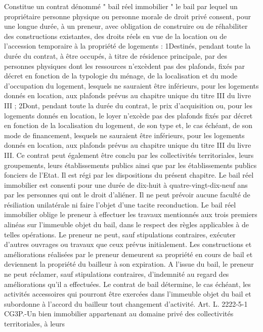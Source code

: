 \documentclass[11pt,a4paper]{report}
\begin{document}
Constitue un contrat dénommé " bail réel immobilier " le bail par lequel un propriétaire personne physique ou
personne morale de droit privé consent, pour une longue durée, à un preneur, avec obligation de construire ou
de réhabiliter des constructions existantes, des droits réels en vue de la location ou de l'accession temporaire à
la propriété de logements :
1\degre  Destinés, pendant toute la durée du contrat, à être occupés, à titre de résidence principale, par des personnes
physiques dont les ressources n'excèdent pas des plafonds, fixés par décret en fonction de la typologie du
ménage, de la localisation et du mode d'occupation du logement, lesquels ne sauraient être inférieurs, pour les
logements donnés en location, aux plafonds prévus au chapitre unique du titre III du livre III ;
2\degre  Dont, pendant toute la durée du contrat, le prix d'acquisition ou, pour les logements donnés en location, le
loyer n'excède pas des plafonds fixés par décret en fonction de la localisation du logement, de son type et, le cas
échéant, de son mode de financement, lesquels ne sauraient être inférieurs, pour les logements donnés en
location, aux plafonds prévus au chapitre unique du titre III du livre III.
Ce contrat peut également être conclu par les collectivités territoriales, leurs groupements, leurs établissements
publics ainsi que par les établissements publics fonciers de l'Etat.
Il est régi par les dispositions du présent chapitre.
Le bail réel immobilier est consenti pour une durée de dix-huit à quatre-vingt-dix-neuf ans par les personnes qui
ont le droit d'aliéner. Il ne peut prévoir aucune faculté de résiliation unilatérale ni faire l'objet d'une tacite
reconduction.
Le bail réel immobilier oblige le preneur à effectuer les travaux mentionnés aux trois premiers alinéas sur
l'immeuble objet du bail, dans le respect des règles applicables à de telles opérations. Le preneur ne peut, sauf
stipulations contraires, exécuter d'autres ouvrages ou travaux que ceux prévus initialement.
Les constructions et améliorations réalisées par le preneur demeurent sa propriété en cours de bail et
deviennent la propriété du bailleur à son expiration. A l'issue du bail, le preneur ne peut réclamer, sauf
stipulations contraires, d'indemnité au regard des améliorations qu'il a effectuées.
Le contrat de bail détermine, le cas échéant, les activités accessoires qui pourront être exercées dans l'immeuble
objet du bail et subordonne à l'accord du bailleur tout changement d'activité.
Art. L. 2222-5-1 CG3P.-Un bien immobilier appartenant au domaine privé des collectivités territoriales, à leurs
\end{document}

